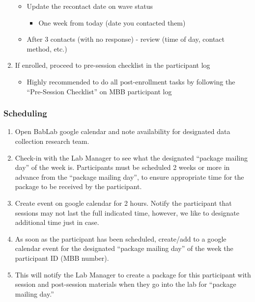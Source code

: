 \documentclass[
]{book}
\providecommand{\tightlist}{%
  \setlength{\itemsep}{0pt}\setlength{\parskip}{0pt}}
\begin{document}
\begin{enumerate}
  \begin{itemize}
  \tightlist
  \item
    Update the recontact date on wave status

    \begin{itemize}
    \tightlist
    \item
      One week from today (date you contacted them)
    \end{itemize}
  \item
    After 3 contacts (with no response) - review (time of day, contact method, etc.)
  \end{itemize}
\item
  If enrolled, proceed to pre-session checklist in the participant log

  \begin{itemize}
  \tightlist
  \item
    Highly recommended to do all post-enrollment tasks by following the ``Pre-Session Checklist'' on MBB participant log
  \end{itemize}
\end{enumerate}

\hypertarget{scheduling}{%
\subsubsection{Scheduling}\label{scheduling}}

\begin{enumerate}
\def\labelenumi{\arabic{enumi}.}
\tightlist
\item
  Open BabLab google calendar and note availability for designated data collection research team.
\item
  Check-in with the Lab Manager to see what the designated ``package mailing day'' of the week is.
  Participants must be scheduled 2 weeks or more in advance from the ``package mailing day'', to ensure appropriate time for the package to be received by the participant.
\item
  Create event on google calendar for 2 hours. Notify the participant that sessions may not last the full indicated time, however, we like to designate additional time just in case.
\item
  As soon as the participant has been scheduled, create/add to a google calendar event for the designated ``package mailing day'' of the week the participant ID (MBB number).
\item
  This will notify the Lab Manager to create a package for this participant with session and post-session materials when they go into the lab for ``package mailing day.''
\end{enumerate}
\end{document}
